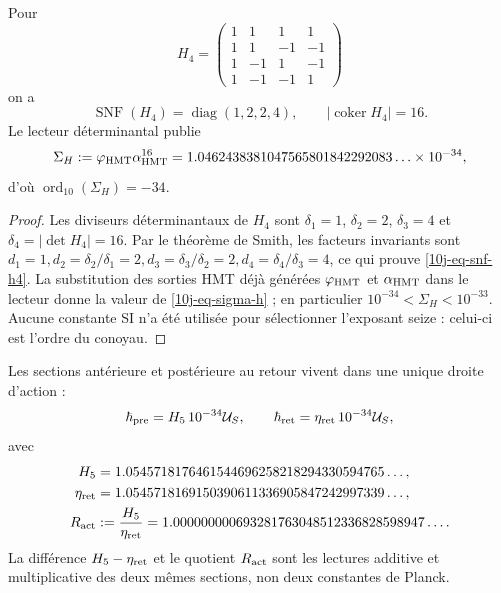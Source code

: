 \begin{theorem}
\label{10j-thm-escala-menos34}
Pour
\begin{equation}
 H_4=
 \begin{pmatrix}
 1&1&1&1\\
 1&1&-1&-1\\
 1&-1&1&-1\\
 1&-1&-1&1
 \end{pmatrix}
 \label{10j-eq-h4}
\end{equation}
on a
\begin{equation}
 \operatorname{SNF}(H_4)=\operatorname{diag}(1,2,2,4),
 \qquad |\operatorname{coker}H_4|=16.
 \label{10j-eq-snf-h4}
\end{equation}
Le lecteur déterminantal publie
\begin{equation}
 \Sigma_H:=\varphi_{\rm HMT}\alpha_{\rm HMT}^{16}
 =1.0462438381047565801842292083\ldots\times10^{-34},
 \label{10j-eq-sigma-h}
\end{equation}
d’où \(\operatorname{ord}_{10}(\Sigma_H)=-34\).
\end{theorem}

\begin{proof}
Les diviseurs déterminantaux de \(H_4\) sont \(\delta_1=1\), \(\delta_2=2\), \(\delta_3=4\) et \(\delta_4=|\det H_4|=16\). Par le théorème de Smith, les facteurs invariants sont \(
 d_1=1,
 d_2=\delta_2/\delta_1=2,
 d_3=\delta_3/\delta_2=2,
 d_4=\delta_4/\delta_3=4
\), ce qui prouve \eqref{10j-eq-snf-h4}. La substitution des sorties HMT déjà générées \(\varphi_{\rm HMT}\) et \(\alpha_{\rm HMT}\) dans le lecteur donne la valeur de \eqref{10j-eq-sigma-h} ; en particulier \(10^{-34}<\Sigma_H<10^{-33}\). Aucune constante SI n'a été utilisée pour sélectionner l'exposant seize : celui-ci est l'ordre du conoyau.
\end{proof}

Les sections antérieure et postérieure au retour vivent dans une unique droite d'action :
\begin{equation}
 \hbar_{\rm pre}=H_5\,10^{-34}\mathcal U_S,
 \qquad
 \hbar_{\rm ret}=\eta_{\rm ret}\,10^{-34}\mathcal U_S,
 \label{10j-eq-secciones-accion}
\end{equation}
avec
\begin{align}
 H_5&=1.0545718176461544696258218294330594765\ldots,\notag\\
 \eta_{\rm ret}&=1.0545718169150390611336905847242997339\ldots,\notag\\
 R_{\rm act}&:=\frac{H_5}{\eta_{\rm ret}}
 =1.000000000693281763048512336828598947\ldots .
 \label{10j-eq-ract}
\end{align}
La différence \(H_5-\eta_{\rm ret}\) et le quotient \(R_{\rm act}\) sont les lectures additive et multiplicative des deux mêmes sections, non deux constantes de Planck.

